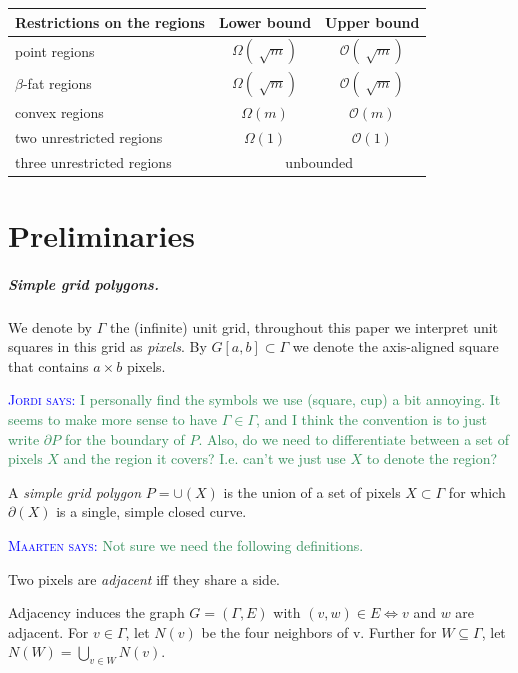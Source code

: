 \documentclass[a4paper,UKenglish,cleveref]{lipics-v2019}
\newcommand{\mremark}[3]{\textcolor{blue}{\textsc{#1 #2:}} \textcolor{SeaGreen}{\textsf{#3}}}
\newcommand{\maarten}[2][says]{\mremark{Maarten}{#1}{#2}}
\newcommand{\jordi}[2][says]{\mremark{Jordi}{#1}{#2}}
\newcommand{\bigo}{\ensuremath{\mathcal O}}
\begin{document}
\begin{table}[H]
\begin{tabular}{lcc}
\toprule
Restrictions on the regions & Lower bound & Upper bound  \\ \midrule
point regions & $\Omega(\sqrt[]{m}) $ & $\bigo(\sqrt[]{m})$ \\
$\beta$-fat regions & $\Omega(\sqrt[]{m}) $ & $\bigo(\sqrt[]{m})$ \\
convex regions & $\Omega(m) $ & $\bigo(m)$ \\
two unrestricted regions &  $\Omega(1)$ & $\bigo(1)$\\
three unrestricted regions &  \multicolumn{2}{c}{unbounded}\\
\bottomrule
\end{tabular}
\end{table}


\section{Preliminaries}
\label {sec:prelims}

\subparagraph {Simple grid polygons.}

We denote by $\Gamma$ the (infinite) unit grid, throughout this paper we interpret unit squares in this grid as \emph{pixels}. By $G[a, b] \subset \Gamma$ we denote the axis-aligned square that contains $a \times b$ pixels. 

\jordi{I personally find the symbols we use (square, cup) a bit annoying. It seems to make more sense to have $\Gamma \in \Gamma$, and I think the convention is to just write $\partial P$ for the boundary of $P$. Also, do we need to differentiate between a set of pixels $X$ and the region it covers? I.e. can't we just use $X$ to denote the region?}

\begin{definition}
A {\em simple grid polygon} $P = \cup(X)$ is the union of a set of pixels $X \subset \Gamma$ for which $\partial(X)$ is a single, simple closed curve.
\end{definition}

\maarten {Not sure we need the following definitions.}

\begin{definition}
Two pixels are \emph{adjacent} iff they share a side.
\end{definition}

Adjacency induces the graph $G=(\Gamma, E)$ with $(v, w)\in E \iff v$ and $w$ are adjacent.
For $v\in \Gamma$, let $N(v)$ be the four neighbors of v. Further for $W\subseteq \Gamma$, let $N(W)=\bigcup_{v\in W} N(v)$.
\end{document}
